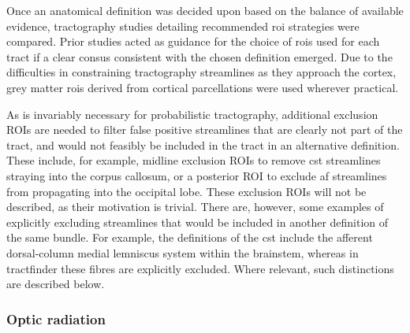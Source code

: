 Once an anatomical definition was decided upon based on the balance of available evidence, tractography studies detailing recommended \gls{roi} strategies were compared.
Prior studies acted as guidance for the choice of \glspl{roi} used for each tract if a clear consus consistent with the chosen definition emerged.
Due to the difficulties in constraining tractography streamlines as they approach the cortex, grey matter \glspl{roi} derived from cortical parcellations were used wherever practical.

As is invariably necessary for probabilistic tractography, additional exclusion ROIs are needed to filter false positive streamlines that are clearly not part of the tract, and would not feasibly be included in the tract in an alternative definition.
These include, for example, midline exclusion ROIs to remove \gls{cst} streamlines straying into the corpus callosum, or a posterior ROI to exclude \gls{af} streamlines from propagating into the occipital lobe.
These exclusion ROIs will not be described, as their motivation is trivial.
There are, however, some examples of explicitly excluding streamlines that would be included in another definition of the same bundle.
For example, the definitions of the \gls{cst} include the afferent dorsal-column medial lemniscus system within the brainstem, whereas in tractfinder these fibres are explicitly excluded.
Where relevant, such distinctions are described below.

\subsubsection*{Optic radiation}

